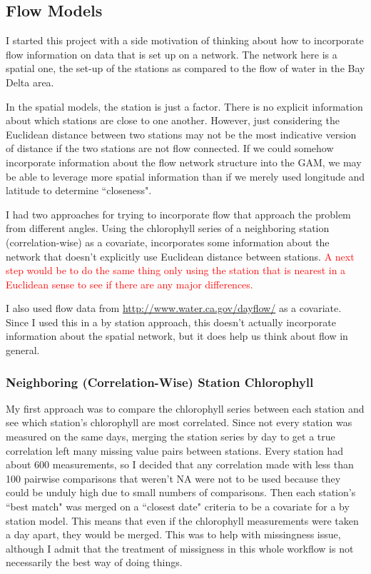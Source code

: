 \documentclass[12pt]{amsart}
\begin{document}
\subsection{Flow Models}

I started this project with a side motivation of thinking about how to incorporate flow information on data that is set up on a network. The network here is a spatial one, the set-up of the stations as compared to the flow of water in the Bay Delta area.

In the spatial models, the station is just a factor. There is no explicit information about which stations are close to one another. However, just considering the Euclidean distance between two stations may not be the most indicative version of distance if the two stations are not flow connected. If we could somehow incorporate information about the flow network structure into the GAM, we may be able to leverage more spatial information than if we merely used longitude and latitude to determine ``closeness".

I had two approaches for trying to incorporate flow that approach the problem from different angles. Using the chlorophyll series of a neighboring station (correlation-wise) as a covariate, incorporates some information about the network that doesn't explicitly use Euclidean distance between stations. \textcolor{red}{A next step would be to do the same thing only using the station that is nearest in a Euclidean sense to see if there are any major differences.}

I also used flow data from \url{http://www.water.ca.gov/dayflow/} as a covariate. Since I used this in a by station approach, this doesn't actually incorporate information about the spatial network, but it does help us think about flow in general. 



\subsubsection{Neighboring (Correlation-Wise) Station Chlorophyll}

My first approach was to compare the chlorophyll series between each station and see which station's chlorophyll are most correlated. Since not every station was measured on the same days, merging the station series by day to get a true correlation left many missing value pairs between stations. Every station had about 600 measurements, so I decided that any correlation made with less than 100 pairwise comparisons that weren't NA were not to be used because they could be unduly high due to small numbers of comparisons. Then each station's ``best match" was merged on a ``closest date" criteria to be a covariate for a by station model. This means that even if the chlorophyll measurements were taken a day apart, they would be merged. This was to help with missingness issue, although I admit that the treatment of missigness in this whole workflow is not necessarily the best way of doing things.
\end{document}
